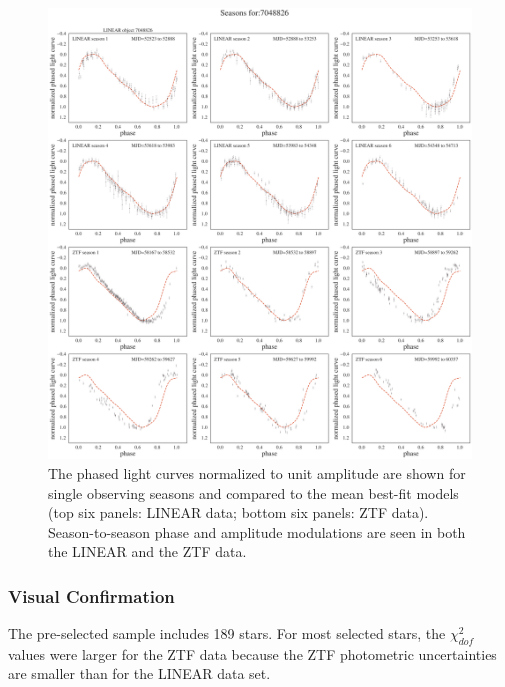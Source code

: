 \begin{figure}[ht]
    \centering
    \includegraphics[width=17cm]{LCplotBySeason7048826.png}
    \caption{The phased light curves normalized to unit amplitude are shown for single observing seasons
      and compared to the mean best-fit models (top six panels: LINEAR data; bottom six panels: ZTF data).
      Season-to-season phase and amplitude modulations are seen in both the LINEAR and the ZTF data.}
      \label{fig:phase4}
\end{figure}


\subsubsection{Visual Confirmation}

The pre-selected sample includes 189 stars. For most selected stars, the $\chi^2_{dof}$ values were larger for the ZTF data
because the ZTF photometric uncertainties are smaller than for the LINEAR data set. 
 
